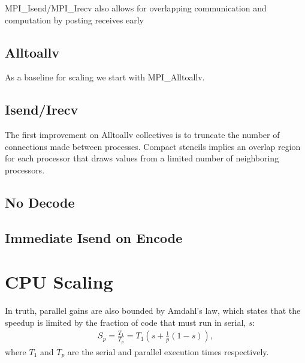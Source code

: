 \documentclass{report}
\begin{document}
MPI\_Isend/MPI\_Irecv also allows for overlapping communication and computation by posting receives early 

\subsection{Alltoallv}
As a baseline for scaling we start with MPI\_Alltoallv. 


\subsection{Isend/Irecv}

The first improvement on Alltoallv collectives is to truncate the number of connections made between processes. Compact stencils implies an overlap region for each processor that draws values from a limited number of neighboring processors. 


\subsection{No Decode}


\subsection{Immediate Isend on Encode}





\section{CPU Scaling}

In truth, parallel gains are also bounded by Amdahl's law, which states that the speedup is limited by the fraction of code that must run in serial, $s$:
\begin{align}
S_p = \frac{T_1}{T_p} = T_1(s + \frac{1}{p}(1-s)),  \nonumber
\end{align}
where $T_1$ and $T_p$ are the serial and parallel execution times respectively. 
\end{document}
